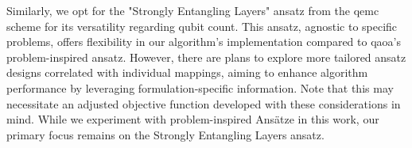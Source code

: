 Similarly, we opt for the "Strongly Entangling Layers" ansatz from the \acrshort{qemc} scheme for its versatility regarding qubit count. This ansatz, agnostic to specific problems, offers flexibility in our algorithm's implementation compared to \acrshort{qaoa}'s problem-inspired ansatz. However, there are plans to explore more tailored ansatz designs correlated with individual mappings, aiming to enhance algorithm performance by leveraging formulation-specific information. Note that this may necessitate an adjusted objective function developed with these considerations in mind. While we experiment with problem-inspired Ansätze in this work, our primary focus remains on the Strongly Entangling Layers ansatz.







